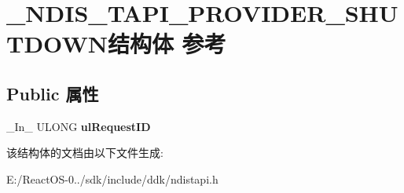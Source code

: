 \hypertarget{struct___n_d_i_s___t_a_p_i___p_r_o_v_i_d_e_r___s_h_u_t_d_o_w_n}{}\section{\+\_\+\+N\+D\+I\+S\+\_\+\+T\+A\+P\+I\+\_\+\+P\+R\+O\+V\+I\+D\+E\+R\+\_\+\+S\+H\+U\+T\+D\+O\+W\+N结构体 参考}
\label{struct___n_d_i_s___t_a_p_i___p_r_o_v_i_d_e_r___s_h_u_t_d_o_w_n}
\subsection*{Public 属性}
\begin{DoxyCompactItemize}
\item 
\mbox{\label{struct___n_d_i_s___t_a_p_i___p_r_o_v_i_d_e_r___s_h_u_t_d_o_w_n_a5b4013e4c5c6cc20050d91d0d46ffae2}} 
\+\_\+\+In\+\_\+ U\+L\+O\+NG {\bfseries ul\+Request\+ID}
\end{DoxyCompactItemize}


该结构体的文档由以下文件生成\+:\begin{DoxyCompactItemize}
\item 
E\+:/\+React\+O\+S-\/0../sdk/include/ddk/ndistapi.\+h\end{DoxyCompactItemize}
